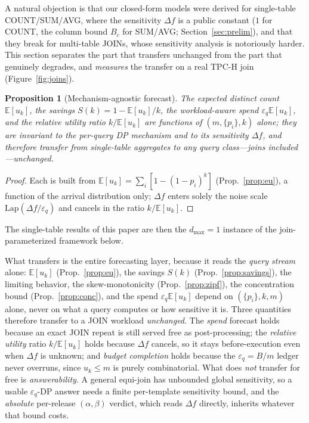 \documentclass[sigconf,nonacm]{acmart}
\newcommand{\eps}{\varepsilon}
\newcommand{\E}{\mathbb{E}}
\newcommand{\Lap}{\mathrm{Lap}}
\newtheorem{prop}{Proposition}
\begin{document}
A natural objection is that our closed-form models were derived for single-table COUNT/SUM/AVG, where the sensitivity $\Delta f$ is a public constant ($1$ for COUNT, the column bound $B_c$ for SUM/AVG; Section~\ref{sec:prelim}), and that they break for multi-table JOINs, whose sensitivity analysis is notoriously harder. This section separates the part that transfers unchanged from the part that genuinely degrades, and \emph{measures} the transfer on a real TPC-H join (Figure~\ref{fig:joins}).

\begin{prop}[Mechanism-agnostic forecast]
\label{prop:agnostic}
The expected distinct count $\E[u_k]$, the savings $S(k)=1-\E[u_k]/k$, the workload-aware spend $\eps_q\E[u_k]$, and the relative utility ratio $k/\E[u_k]$ are functions of $(m,\{p_i\},k)$ alone; they are invariant to the per-query DP mechanism and to its sensitivity $\Delta f$, and therefore transfer from single-table aggregates to any query class---joins included---unchanged.
\end{prop}
\begin{proof}
Each is built from $\E[u_k]=\sum_i[1-(1-p_i)^k]$ (Prop.~\ref{prop:eu}), a function of the arrival distribution only; $\Delta f$ enters solely the noise scale $\Lap(\Delta f/\eps_q)$ and cancels in the ratio $k/\E[u_k]$. \end{proof}

\noindent The single-table results of this paper are then the $d_{\max}{=}1$ instance of the join-parameterized framework below.

What transfers is the entire forecasting layer, because it reads the \emph{query stream} alone: $\E[u_k]$ (Prop.~\ref{prop:eu}), the savings $S(k)$ (Prop.~\ref{prop:savings}), the limiting behavior, the skew-monotonicity (Prop.~\ref{prop:zipf}), the concentration bound (Prop.~\ref{prop:conc}), and the spend $\eps_q\E[u_k]$ depend on $(\{p_i\},k,m)$ alone, never on what a query computes or how sensitive it is. Three quantities therefore transfer to a JOIN workload \emph{unchanged}. The \emph{spend} forecast holds because an exact JOIN repeat is still served free as post-processing; the \emph{relative utility} ratio $k/\E[u_k]$ holds because $\Delta f$ cancels, so it stays before-execution even when $\Delta f$ is unknown; and \emph{budget completion} holds because the $\eps_q{=}B/m$ ledger never overruns, since $u_k\le m$ is purely combinatorial. What does \emph{not} transfer for free is \emph{answerability}. A general equi-join has unbounded global sensitivity, so a usable $\eps_q$-DP answer needs a finite per-template sensitivity bound, and the \emph{absolute} per-release $(\alpha,\beta)$ verdict, which reads $\Delta f$ directly, inherits whatever that bound costs.
\end{document}
